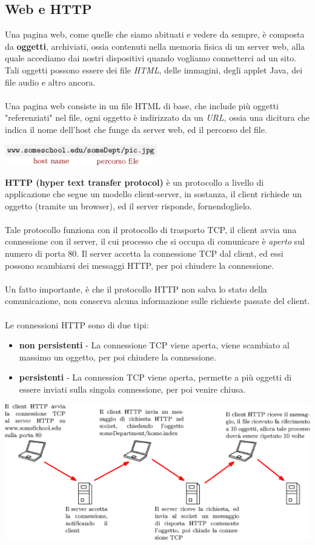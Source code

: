 \documentclass[12pt, letterpaper]{article}
\newcommand{\acc}{\\\hphantom{}\\}
\begin{document}
\subsection{Web e HTTP}
Una pagina web, come quelle che siamo abituati e vedere da sempre, è composta da \textbf{oggetti}, archiviati,
ossia contenuti nella memoria fisica di un server web, alla quale accediamo dai nostri dispositivi quando vogliamo
connetterci ad un sito. Tali oggetti possono essere dei file \textit{HTML}, delle immagini, degli
applet Java, dei file audio e altro ancora.\acc
Una pagina web consiste in un file HTML di base, che include più oggetti "referenziati" nel file, ogni oggetto
è indirizzato da un \textit{URL}, ossia una dicitura che indica il nome dell'host che funge da
server web, ed il percorso del file.\begin{center}
    \includegraphics[width=0.5\textwidth ]{images/url.eps}
\end{center}
\textbf{HTTP (hyper text transfer protocol)} è un protocollo a livello di applicazione che segue un
modello client-server, in sostanza, il client richiede un oggetto (tramite un browser), ed il server
risponde, fornendoglielo.   \acc Tale protocollo funziona con il protocollo di trasporto TCP, il client avvia una
connessione con il server, il cui processo che si occupa di comunicare è \textit{aperto} sul numero di
porta 80. Il server accetta la connessione TCP dal client, ed essi possono scambiarsi dei messaggi
HTTP, per poi chiudere la connessione.\acc
Un fatto importante, è che il protocollo HTTP non salva lo stato della comunicazione, non conserva alcuna
informazione sulle richieste passate del client.\acc
Le connessioni HTTP sono di due tipi:\begin{itemize}
    \item \textbf{non persistenti} - La connessione TCP viene aperta, viene scambiato al massimo un oggetto,
          per poi chiudere la connessione.
    \item \textbf{persistenti} - La connession TCP viene aperta, permette a più oggetti di essere inviati
          sulla singola connessione, per poi venire chiusa.
\end{itemize}\begin{center}
    \includegraphics[width=1\textwidth ]{images/httpnonPersistente.eps}
\end{center}
\end{document}
